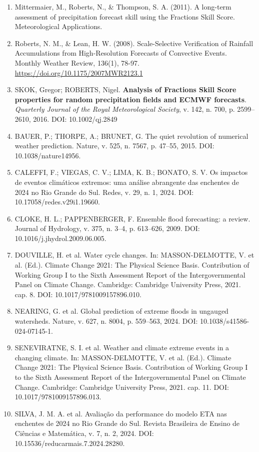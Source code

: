 \documentclass[12pt,a4paper,oneside]{book}
\begin{document}
\begin{enumerate}
\item
  Mittermaier, M., Roberts, N., \& Thompson, S. A. (2011). A long-term assessment of precipitation forecast skill using the Fractions Skill Score. Meteorological Applications.
\item
  Roberts, N. M., \& Lean, H. W. (2008). Scale-Selective Verification of Rainfall Accumulations from High-Resolution Forecasts of Convective Events. Monthly Weather Review, 136(1), 78-97. \url{https://doi.org/10.1175/2007MWR2123.1}
\item
  SKOK, Gregor; ROBERTS, Nigel. \textbf{Analysis of Fractions Skill Score properties for random precipitation fields and ECMWF forecasts}. \emph{Quarterly Journal of the Royal Meteorological Society}, v. 142, n. 700, p. 2599--2610, 2016. DOI: 10.1002/qj.2849
\item
  BAUER, P.; THORPE, A.; BRUNET, G. The quiet revolution of numerical weather prediction. Nature, v. 525, n. 7567, p. 47--55, 2015. DOI: 10.1038/nature14956.
\item
  CALEFFI, F.; VIEGAS, C. V.; LIMA, K. B.; BONATO, S. V. Os impactos de eventos climáticos extremos: uma análise abrangente das enchentes de 2024 no Rio Grande do Sul. Redes, v. 29, n. 1, 2024. DOI: 10.17058/redes.v29i1.19660.
\item
  CLOKE, H. L.; PAPPENBERGER, F. Ensemble flood forecasting: a review. Journal of Hydrology, v. 375, n. 3--4, p. 613--626, 2009. DOI: 10.1016/j.jhydrol.2009.06.005.
\item
  DOUVILLE, H. et al. Water cycle changes. In: MASSON-DELMOTTE, V. et al. (Ed.). Climate Change 2021: The Physical Science Basis. Contribution of Working Group I to the Sixth Assessment Report of the Intergovernmental Panel on Climate Change. Cambridge: Cambridge University Press, 2021. cap. 8. DOI: 10.1017/9781009157896.010.
\item
  NEARING, G. et al. Global prediction of extreme floods in ungauged watersheds. Nature, v. 627, n. 8004, p. 559--563, 2024. DOI: 10.1038/s41586-024-07145-1.
\item
  SENEVIRATNE, S. I. et al. Weather and climate extreme events in a changing climate. In: MASSON-DELMOTTE, V. et al. (Ed.). Climate Change 2021: The Physical Science Basis. Contribution of Working Group I to the Sixth Assessment Report of the Intergovernmental Panel on Climate Change. Cambridge: Cambridge University Press, 2021. cap. 11. DOI: 10.1017/9781009157896.013.
\item
  SILVA, J. M. A. et al. Avaliação da performance do modelo ETA nas enchentes de 2024 no Rio Grande do Sul. Revista Brasileira de Ensino de Ciências e Matemática, v. 7, n. 2, 2024. DOI: 10.15536/reducarmais.7.2024.28280.

\end{enumerate}
\end{document}
